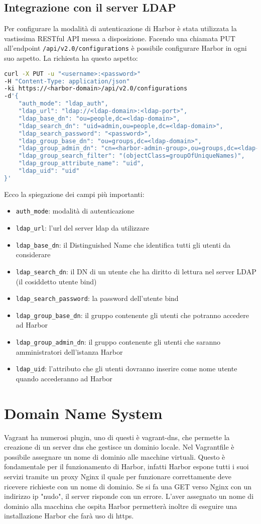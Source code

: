 \documentclass[12pt,a4paper]{report}
\begin{document}
\subsection{Integrazione con il server LDAP}
Per configurare la modalità di autenticazione di Harbor è stata utilizzata la vastissima RESTful API messa a disposizione. 
Facendo una chiamata PUT all'endpoint \texttt{/api/v2.0/configurations} è possibile configurare Harbor in ogni suo aspetto. La richiesta ha questo aspetto:
\begin{lstlisting}[language=bash]
curl -X PUT -u "<username>:<password>" 
-H "Content-Type: application/json" 
-ki https://<harbor-domain>/api/v2.0/configurations 
-d'{
    "auth_mode": "ldap_auth",
    "ldap_url": "ldap://<ldap-domain>:<ldap-port>",
    "ldap_base_dn": "ou=people,dc=<ldap-domain>",
    "ldap_search_dn": "uid=admin,ou=people,dc=<ldap-domain>",
    "ldap_search_password": "<password>",
    "ldap_group_base_dn": "ou=groups,dc=<ldap-domain>",
    "ldap_group_admin_dn": "cn=<harbor-admin-group>,ou=groups,dc=<ldap-domain>",
    "ldap_group_search_filter": "(objectClass=groupOfUniqueNames)",
    "ldap_group_attribute_name": "uid",
    "ldap_uid": "uid"
}'
\end{lstlisting}
Ecco la spiegazione dei campi più importanti:
\begin{itemize}
    \item \texttt{auth\_mode}: modalità di autenticazione
    \item \texttt{ldap\_url}: l'url del server ldap da utilizzare
    \item \texttt{ldap\_base\_dn}: il Distinguished Name che identifica tutti gli utenti da considerare
    \item \texttt{ldap\_search\_dn}: il DN di un utente che ha diritto di lettura nel server LDAP (il cosiddetto utente bind)
    \item \texttt{ldap\_search\_password}: la password dell'utente bind
    \item \texttt{ldap\_group\_base\_dn}: il gruppo contenente gli utenti che potranno accedere ad Harbor
    \item \texttt{ldap\_group\_admin\_dn}: il gruppo contenente gli utenti che saranno amministratori dell'istanza Harbor
    \item \texttt{ldap\_uid}: l'attributo che gli utenti dovranno inserire come nome utente quando accederanno ad Harbor
\end{itemize}
\section{Domain Name System}
Vagrant ha numerosi plugin, uno di questi è vagrant-dns, che permette la creazione di un server dns che gestisce un dominio locale. Nel Vagrantfile è possibile assegnare un nome di dominio alle macchine virtuali. Questo è fondamentale per il funzionamento di Harbor, infatti Harbor espone tutti i suoi servizi tramite un proxy Nginx il quale per funzionare correttamente deve ricevere richieste con un nome di dominio. Se si fa una GET verso Nginx con un indirizzo ip "nudo", il server risponde con un errore.
L'aver assegnato un nome di dominio alla macchina che ospita Harbor permetterà inoltre di eseguire una installazione Harbor che farà uso di https.
\end{document}
